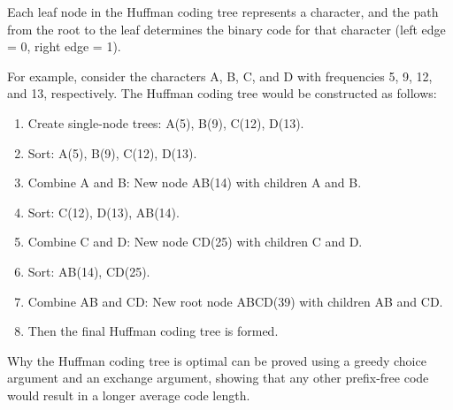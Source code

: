 Each leaf node in the Huffman coding tree represents a character, and the path from the root to the leaf determines the binary code for that character (left edge = 0, right edge = 1).

For example, consider the characters A, B, C, and D with frequencies 5, 9, 12, and 13, respectively. The Huffman coding tree would be constructed as follows:
\begin{enumerate}
    \item Create single-node trees: A(5), B(9), C(12), D(13).
    \item Sort: A(5), B(9), C(12), D(13).
    \item Combine A and B: New node AB(14) with children A and B.
    \item Sort: C(12), D(13), AB(14).
    \item Combine C and D: New node CD(25) with children C and D.
    \item Sort: AB(14), CD(25).
    \item Combine AB and CD: New root node ABCD(39) with children AB and CD.
    \item Then the final Huffman coding tree is formed.
\end{enumerate}

Why the Huffman coding tree is optimal can be proved using a greedy choice argument and an exchange argument, showing that any other prefix-free code would result in a longer average code length.

